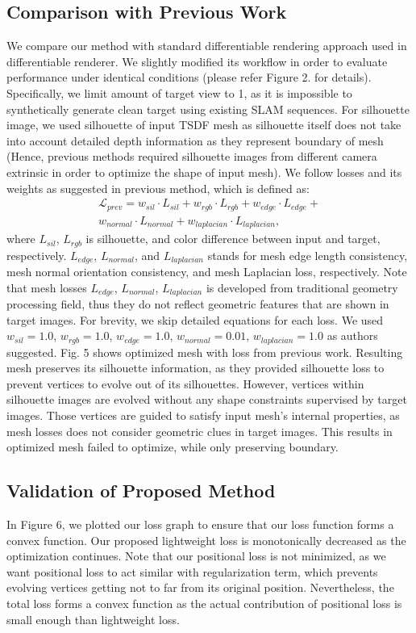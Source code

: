 \subsection{Comparison with Previous Work}
We compare our method with standard differentiable rendering approach used in differentiable renderer\cite{liu2019soft}. 
We slightly modified its workflow in order to evaluate performance under identical conditions (please refer Figure 2. for details). 
Specifically, we limit amount of target view to 1, as it is impossible to synthetically generate clean target using existing SLAM sequences. 
For silhouette image, we used silhouette of input TSDF mesh as silhouette itself does not take into account detailed depth information as they represent boundary of mesh (Hence, previous methods required silhouette images from different camera extrinsic in order to optimize the shape of input mesh). 
We follow losses and its weights as suggested in previous method\cite{ravi2020accelerating}, which is defined as: 
\begin{multline*}
    \mathcal{L}_{prev}=w_{sil}\cdot L_{sil}+w_{rgb}\cdot L_{rgb}+w_{edge}\cdot L_{edge}+ \\ 
    w_{normal}\cdot L_{normal}+w_{laplacian}\cdot L_{laplacian}, 
\end{multline*}
where $L_{sil}$, $L_{rgb}$ is silhouette, and color difference between input and target, respectively. 
$L_{edge}$, $L_{normal}$, and $L_{laplacian}$ stands for mesh edge length consistency, mesh normal orientation consistency, and mesh Laplacian loss, respectively. 
Note that mesh losses $L_{edge}$, $L_{normal}$, $L_{laplacian}$ is developed from traditional geometry processing field, thus they do not reflect geometric features that are shown in target images. 
For brevity, we skip detailed equations for each loss. 
We used $w_{sil}=1.0$, $w_{rgb}=1.0$, $w_{edge}=1.0$, $w_{normal}=0.01$, $w_{laplacian}=1.0$ as authors suggested.
Fig. 5 shows optimized mesh with loss from previous work. 
Resulting mesh preserves its silhouette information, as they provided silhouette loss to prevent vertices to evolve out of its silhouettes. 
However, vertices within silhouette images are evolved without any shape constraints supervised by target images. 
Those vertices are guided to satisfy input mesh’s internal properties, as mesh losses does not consider geometric clues in target images. 
This results in optimized mesh failed to optimize, while only preserving boundary.

\subsection{Validation of Proposed Method}
In Figure 6, we plotted our loss graph to ensure that our loss function forms a convex function. 
Our proposed lightweight loss is monotonically decreased as the optimization continues. 
Note that our positional loss is not minimized, as we want positional loss to act similar with regularization term, which prevents evolving vertices getting not to far from its original position. 
Nevertheless, the total loss forms a convex function as the actual contribution of positional loss is small enough than lightweight loss. 

